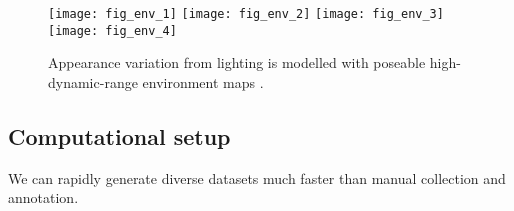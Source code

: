 \begin{figure}
    \texttt{[image: fig\_env\_1]} \hfill
    \texttt{[image: fig\_env\_2]} \hfill
    \texttt{[image: fig\_env\_3]} \hfill
    \texttt{[image: fig\_env\_4]}
    \caption{Appearance variation from lighting is modelled with poseable high-dynamic-range environment maps \cite{debevec2002image}.}
    \label{fig:participants}
\end{figure}

\subsection{Computational setup}

We can rapidly generate diverse datasets much faster than manual collection and annotation.